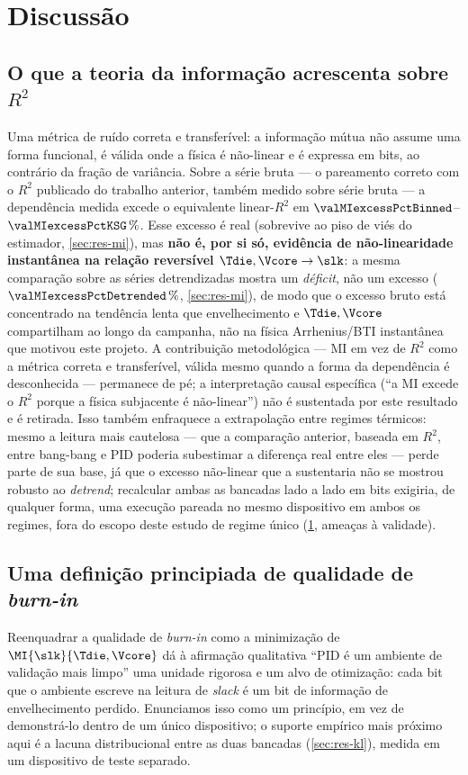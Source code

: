 \section{Discussão}
\label{sec:discussion}


\subsection{O que a teoria da informação acrescenta sobre $R^2$}
Uma métrica de ruído correta e transferível: a informação mútua não assume
uma forma funcional, é válida onde a física é não-linear e é expressa em
bits, ao contrário da fração de variância. Sobre a série bruta --- o
pareamento correto com o $R^2$ publicado do trabalho anterior, também
medido sobre série bruta --- a dependência medida excede o equivalente
linear-$R^2$ em $\valMIexcessPctBinned$--$\valMIexcessPctKSG\,\%$. Esse
excesso é real (sobrevive ao piso de viés do estimador,
\cref{sec:res-mi}), mas \textbf{não é, por si só, evidência de
não-linearidade instantânea na relação reversível $\Tdie,\Vcore\to\slk$}: a
mesma comparação sobre as séries detrendizadas mostra um \emph{déficit}, não
um excesso ($\valMIexcessPctDetrended\,\%$, \cref{sec:res-mi}), de modo que
o excesso bruto está concentrado na tendência lenta que envelhecimento e
$\Tdie,\Vcore$ compartilham ao longo da campanha, não na física
Arrhenius/BTI instantânea que motivou este projeto. A contribuição
metodológica --- MI em vez de $R^2$ como a métrica correta e transferível,
válida mesmo quando a forma da dependência é desconhecida --- permanece de
pé; a interpretação causal específica (``a MI excede o $R^2$ porque a
física subjacente é não-linear'') não é sustentada por este resultado e é
retirada. Isso também enfraquece a extrapolação entre regimes térmicos: mesmo a
leitura mais cautelosa --- que a comparação anterior, baseada em $R^2$,
entre bang-bang e PID poderia subestimar a diferença real entre eles ---
perde parte de sua base, já que o excesso não-linear que a sustentaria não
se mostrou robusto ao \emph{detrend}; recalcular ambas as bancadas lado a
lado em bits exigiria, de qualquer forma, uma execução pareada no mesmo
dispositivo em ambos os regimes, fora do escopo deste estudo de regime
único (\cref{sec:discussion}, ameaças à validade).

\subsection{Uma definição principiada de qualidade de \emph{burn-in}}
Reenquadrar a qualidade de \emph{burn-in} como a minimização de
$\MI{\slk}{\Tdie,\Vcore}$ dá à afirmação qualitativa ``PID é um ambiente de
validação mais limpo'' uma unidade rigorosa e um alvo de otimização: cada
bit que o ambiente escreve na leitura de \emph{slack} é um bit de
informação de envelhecimento perdido. Enunciamos isso como um princípio, em
vez de demonstrá-lo dentro de um único dispositivo; o suporte empírico mais
próximo aqui é a lacuna distribucional entre as duas bancadas
(\cref{sec:res-kl}), medida em um dispositivo de teste separado.

